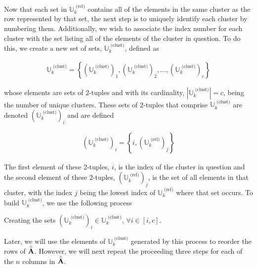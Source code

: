 \documentclass[../../ClusteringConnectionsMAIN.tex]{subfiles}
\begin{document}
\begin{flushleft}
\begin{large}

Now that each set in $\mathbb{U}_k^\text{ (rel)}$ contains all of the elements in the same cluster as the row represented by that set, the next step is to uniquely identify each cluster by numbering them.  Additionally, we wish to associate the index number for each cluster with the set listing all of the elements of the cluster in question.  To do this, we create a new set of sets, $\mathbb{U}_k^\text{ (clust)}$, defined as

\begin{align*}
\mathbb{U}_k^\text{ (clust)} = \left\{ \left( \mathbb{U}_k^\text{ (clust)} \right)_1, \left( \mathbb{U}_k^\text{ (clust)} \right)_2, \dots, \left( \mathbb{U}_k^\text{ (clust)} \right)_c \right\}
\end{align*}

whose elements are sets of 2-tuples and with its cardinality, $\left| \mathbb{U}_k^\text{ (clust)} \right| = c$, being the number of unique clusters.  These sets of 2-tuples that comprise $\mathbb{U}_k^\text{ (clust)}$ are denoted $\left( \mathbb{U}_k^\text{ (clust)} \right)_i$ and are defined 

\begin{align}
\left( \mathbb{U}_k^\text{ (clust)} \right)_i = \left\{ i, \left( \mathbb{U}_k^\text{ (rel)} \right)_j \right\}
\end{align}

The first element of these 2-tuples, $i$, is the index of the cluster in question and the second element of these 2-tuples, $\left( \mathbb{U}_k^\text{ (rel)} \right)_j$, is the set of all elements in that cluster, with the index $j$ being the lowest index of $\mathbb{U}_k^\text{ (rel)}$ where that set occurs.  To build $\mathbb{U}_k^\text{ (clust)}$, we use the following process

\begin{algorithm}
\caption{Creating the sets $\left( \mathbb{U}_k^\text{ (clust)} \right)_i \in \mathbb{U}_k^\text{ (clust)}$, $\forall i \in \left[ i, c \right]$.}
\end{algorithm}

Later, we will use the elements of $\mathbb{U}_k^\text{ (clust)}$ generated by this process to reorder the rows of $\bar{\bar{\mathbf{A}}}$. However, we will next repeat the proceeding three steps for each of the $n$ columns in $\bar{\bar{\mathbf{A}}}$.



\end{large}
\end{flushleft}
\end{document}
